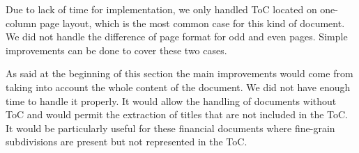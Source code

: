 Due to lack of time for implementation, we only handled ToC located on one-column page layout, which is the most common case for this kind of document. We did not handle the difference of page format for odd and even pages. Simple improvements can be done to cover these two cases.

As said at the beginning of this section the main improvements would come from taking into account the whole content of the document. We did not have enough time to handle it properly. It would allow the handling of documents without ToC and would permit the extraction of titles that are not included in the ToC. It would be particularly useful for these financial documents where fine-grain subdivisions are present but not represented in the ToC.
